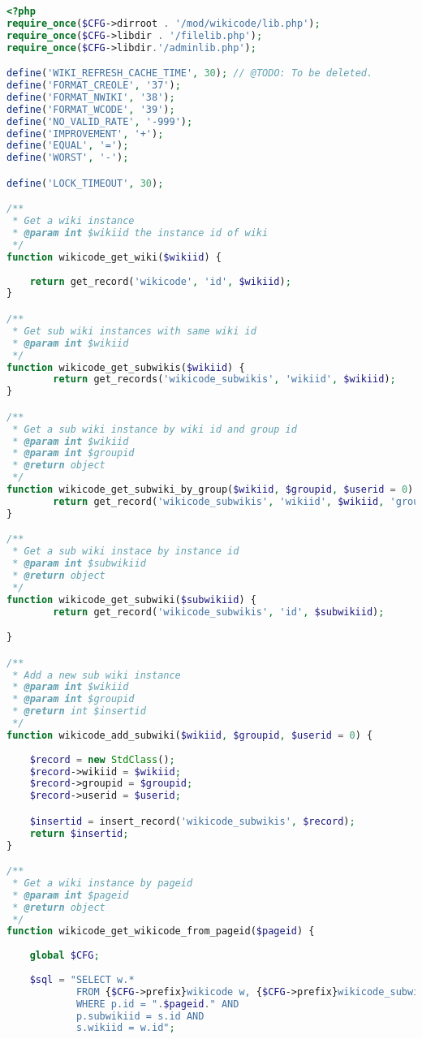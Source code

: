\begin{lstlisting}[language=PHP]
<?php
require_once($CFG->dirroot . '/mod/wikicode/lib.php');
require_once($CFG->libdir . '/filelib.php');
require_once($CFG->libdir.'/adminlib.php');

define('WIKI_REFRESH_CACHE_TIME', 30); // @TODO: To be deleted.
define('FORMAT_CREOLE', '37');
define('FORMAT_NWIKI', '38');
define('FORMAT_WCODE', '39');
define('NO_VALID_RATE', '-999');
define('IMPROVEMENT', '+');
define('EQUAL', '=');
define('WORST', '-');

define('LOCK_TIMEOUT', 30);

/**
 * Get a wiki instance
 * @param int $wikiid the instance id of wiki
 */
function wikicode_get_wiki($wikiid) {
    
    return get_record('wikicode', 'id', $wikiid);
}

/**
 * Get sub wiki instances with same wiki id
 * @param int $wikiid
 */
function wikicode_get_subwikis($wikiid) {
        return get_records('wikicode_subwikis', 'wikiid', $wikiid);
}

/**
 * Get a sub wiki instance by wiki id and group id
 * @param int $wikiid
 * @param int $groupid
 * @return object
 */
function wikicode_get_subwiki_by_group($wikiid, $groupid, $userid = 0) {
        return get_record('wikicode_subwikis', 'wikiid', $wikiid, 'groupid', $groupid, 'userid', $userid);
}

/**
 * Get a sub wiki instace by instance id
 * @param int $subwikiid
 * @return object
 */
function wikicode_get_subwiki($subwikiid) {
        return get_record('wikicode_subwikis', 'id', $subwikiid);

}

/**
 * Add a new sub wiki instance
 * @param int $wikiid
 * @param int $groupid
 * @return int $insertid
 */
function wikicode_add_subwiki($wikiid, $groupid, $userid = 0) {
    
    $record = new StdClass();
    $record->wikiid = $wikiid;
    $record->groupid = $groupid;
    $record->userid = $userid;

    $insertid = insert_record('wikicode_subwikis', $record);
    return $insertid;
}

/**
 * Get a wiki instance by pageid
 * @param int $pageid
 * @return object
 */
function wikicode_get_wikicode_from_pageid($pageid) {
	
	global $CFG;
    
    $sql = "SELECT w.*
            FROM {$CFG->prefix}wikicode w, {$CFG->prefix}wikicode_subwikis s, {$CFG->prefix}wikicode_pages p
            WHERE p.id = ".$pageid." AND
            p.subwikiid = s.id AND
            s.wikiid = w.id";


\end{lstlisting}

